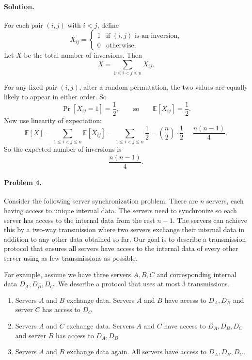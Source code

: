 \documentclass[10pt]{article}
\begin{document}
\paragraph{Solution.} For each pair $(i,j)$ with $i<j$, define
\[
X_{ij}=
\begin{cases}
1 & \text{if $(i,j)$ is an inversion,}\\
0 & \text{otherwise.}
\end{cases}
\]
Let $X$ be the total number of inversions.  Then
\[
X=\sum_{1\le i<j\le n} X_{ij}.
\]

For any fixed pair $(i,j)$, after a random permutation, the two values are equally likely to appear in either order.  So
\[
\Pr[X_{ij}=1]=\frac12,
\qquad\text{so}\qquad
\mathbb{E}[X_{ij}]=\frac12.
\]
Now use linearity of expectation:
\[
\mathbb{E}[X]
=\sum_{1\le i<j\le n}\mathbb{E}[X_{ij}]
=\sum_{1\le i<j\le n}\frac12
=\binom{n}{2}\cdot \frac12
=\frac{n(n-1)}{4}.
\]
So the expected number of inversions is
\[
\boxed{\frac{n(n-1)}{4}}.
\]

\paragraph{Problem 4.}  Consider the following server synchronization problem. There are $n$ servers, each having access to unique internal data. The servers need to synchronize so each server has access to the internal data from the rest $n-1$. The servers can achieve this by a two-way transmission where two servers exchange their internal data in addition to any other data obtained so far. 
Our goal is to describe a transmission protocol that ensures all servers have access to the internal data of every other server using as few transmissions as possible.


For example, assume we have three servers $A,B,C$ and corresponding internal data $D_A,D_B,D_C$. We describe a protocol that uses at most $3$ transmissions.


\begin{enumerate}
\item Servers $A$ and $B$ exchange data. Servers $A$ and $B$ have access to $D_A,D_B$ and server $C$ has access to $D_C$
\item Servers $A$ and $C$ exchange data. Servers $A$ and $C$  have access to $D_A,D_B,D_C$  and server $B$ has access to $D_A,D_B$
\item Servers $A$ and $B$ exchange data again. All servers have access to $D_A,D_B,D_C$. 
\end{enumerate}  
\end{document}
